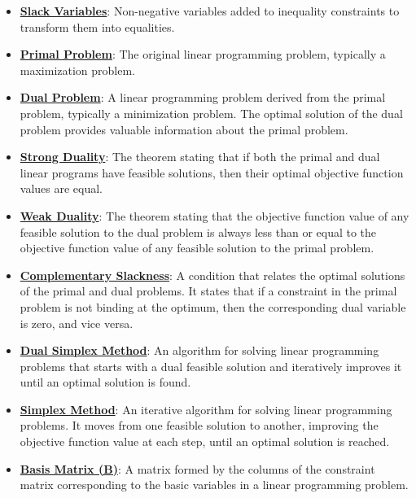 \documentclass{article}%
\begin{document}
\begin{itemize}[leftmargin=*]
\item \href{https://www.math.purdue.edu/~yipn/421/2024-10-01-SensitivityDuality.pdf#page=5}{\textbf{Slack Variables}}: Non-negative variables added to inequality constraints to transform them into equalities. %
\item \href{https://www.math.purdue.edu/~yipn/421/2024-10-03-DualSimplexMatrix.pdf#page=2}{\textbf{Primal Problem}}: The original linear programming problem, typically a maximization problem. %
\item \href{https://www.math.purdue.edu/~yipn/421/2024-10-03-DualSimplexMatrix.pdf#page=2}{\textbf{Dual Problem}}: A linear programming problem derived from the primal problem, typically a minimization problem. The optimal solution of the dual problem provides valuable information about the primal problem. %
\item \href{https://www.math.purdue.edu/~yipn/421/2024-10-03-DualSimplexMatrix.pdf#page=1}{\textbf{Strong Duality}}: The theorem stating that if both the primal and dual linear programs have feasible solutions, then their optimal objective function values are equal. %
\item \href{https://www.math.purdue.edu/~yipn/421/2024-10-03-DualSimplexMatrix.pdf#page=1}{\textbf{Weak Duality}}: The theorem stating that the objective function value of any feasible solution to the dual problem is always less than or equal to the objective function value of any feasible solution to the primal problem. %
\item \href{https://www.math.purdue.edu/~yipn/421/2024-10-03-DualSimplexMatrix.pdf#page=2}{\textbf{Complementary Slackness}}: A condition that relates the optimal solutions of the primal and dual problems. It states that if a constraint in the primal problem is not binding at the optimum, then the corresponding dual variable is zero, and vice versa. %
\item \href{https://www.math.purdue.edu/~yipn/421/2024-10-03-DualSimplexMatrix.pdf#page=2}{\textbf{Dual Simplex Method}}: An algorithm for solving linear programming problems that starts with a dual feasible solution and iteratively improves it until an optimal solution is found. %
\item \href{https://www.math.purdue.edu/~yipn/421/2024-10-03-DualSimplexMatrix.pdf#page=7}{\textbf{Simplex Method}}: An iterative algorithm for solving linear programming problems. It moves from one feasible solution to another, improving the objective function value at each step, until an optimal solution is reached. %
\item \href{https://www.math.purdue.edu/~yipn/421/2024-10-03-DualSimplexMatrix.pdf#page=7}{\textbf{Basis Matrix (B)}}: A matrix formed by the columns of the constraint matrix corresponding to the basic variables in a linear programming problem. %

\end{itemize}
\end{document}
